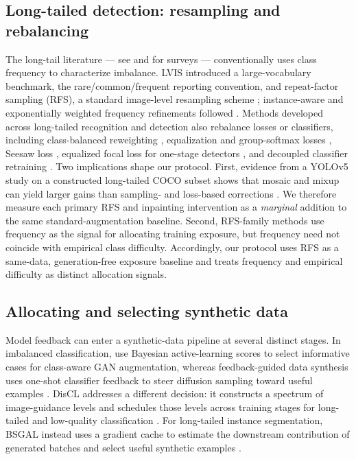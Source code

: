 \documentclass[preprint,12pt,authoryear]{elsarticle}
\begin{document}
\subsection{Long-tailed detection: resampling and rebalancing}
The long-tail literature --- see \citet{oksuz2021imbalance} and
\citet{zhang2023longtail} for surveys --- conventionally uses class
frequency to characterize imbalance. LVIS introduced a large-vocabulary
benchmark, the rare/common/frequent reporting convention, and
repeat-factor sampling (RFS), a standard image-level resampling scheme
\citep{gupta2019lvis}; instance-aware and exponentially weighted
frequency refinements followed \citep{yaman2023irfs,ahmed2025eirfs}.
Methods developed across long-tailed recognition and detection also
rebalance losses or classifiers, including class-balanced reweighting
\citep{cui2019classbalanced}, equalization and group-softmax losses
\citep{tan2020equalization,li2020bags}, Seesaw loss
\citep{wang2021seesaw}, equalized focal loss for one-stage detectors
\citep{li2022efl}, and decoupled classifier retraining
\citep{kang2020decoupling}. Two implications shape our protocol. First,
evidence from a YOLOv5 study on a constructed long-tailed COCO subset
shows that mosaic and mixup can yield larger gains than sampling- and
loss-based corrections \citep{crasto2024imbalance}. We therefore measure
each primary RFS and inpainting intervention as a \emph{marginal}
addition to the same standard-augmentation baseline. Second, RFS-family
methods use frequency
as the signal for allocating training exposure, but frequency need not
coincide with empirical class difficulty. Accordingly, our protocol uses
RFS as a same-data, generation-free exposure baseline and treats frequency
and empirical difficulty as distinct allocation signals.

\subsection{Allocating and selecting synthetic data}
Model feedback can enter a synthetic-data pipeline at several distinct
stages. In imbalanced classification, \citet{bozorgtabar2019informative}
use Bayesian active-learning scores to select informative cases for
class-aware GAN augmentation, whereas feedback-guided data synthesis uses
one-shot classifier feedback to steer diffusion sampling toward useful
examples \citep{hemmat2024feedback}. DisCL addresses a different decision:
it constructs a spectrum of image-guidance levels and schedules those
levels across training stages for long-tailed and low-quality
classification \citep{liang2025discl}. For long-tailed instance
segmentation, BSGAL instead uses a gradient cache to estimate the
downstream contribution of generated batches and select useful synthetic
examples \citep{zhu2024bsgal}.
\end{document}
